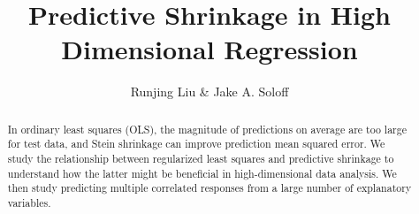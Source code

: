 \documentclass[a4paper]{article}
\title{Predictive Shrinkage in High Dimensional Regression}
\author{Runjing Liu \& Jake A. Soloff}
\begin{document}
\maketitle

\begin{abstract}
\noindent In ordinary least squares (OLS), the magnitude of predictions on average are too large for test data,
and Stein shrinkage can improve prediction mean squared error.
We study the relationship between regularized least squares and predictive shrinkage to understand how the
latter might be beneficial in high-dimensional data analysis.
We then study predicting multiple correlated responses from a large number of explanatory variables.
\end{abstract}

\tableofcontents

\newpage







\newpage
 


\newpage





\newpage



\end{document}

